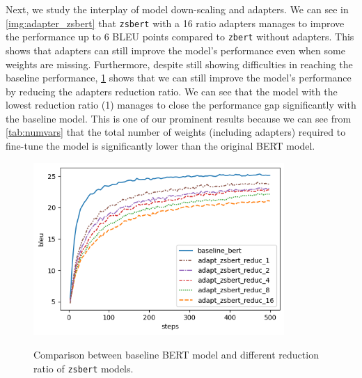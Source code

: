 Next, we study the interplay of model down-scaling and adapters. We can see in \cref{img:adapter_zsbert} that \texttt{zsbert} with a 16 ratio adapters manages to improve the performance up to 6 BLEU points compared to \texttt{zbert} without adapters. This shows that adapters can still improve the model's performance even when some weights are missing. Furthermore, despite still showing difficulties in reaching the baseline performance, \cref{img:adapter_zsbert_ratio} shows that we can still improve the model's performance by reducing the adapters reduction ratio.
We can see that the model with the lowest reduction ratio (1) manages to close the performance gap significantly with the baseline model. This is one of our prominent results because we can see from \cref{tab:numvars} that the total number of weights (including adapters) required to fine-tune the model is significantly lower than the original BERT model.

\begin{figure}[]
    {\includegraphics[width=0.85\textwidth]{img/adapter_zsbert_ratio.png}}
    \centering
    \caption{Comparison between baseline BERT model and different reduction ratio of \texttt{zsbert} models.}
    \label{img:adapter_zsbert_ratio}
\end{figure}


